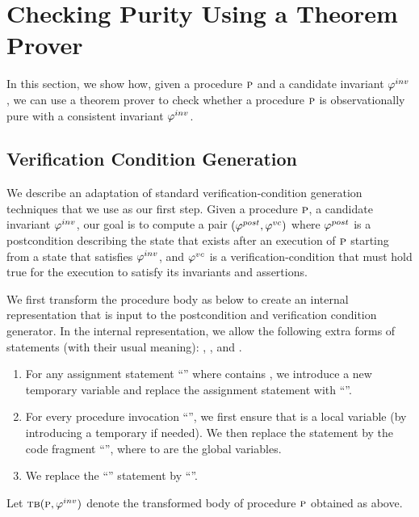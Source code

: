 \newcommand{\existformula}{\psi^e}
\newcommand{\EA}{\textsc{ea}}
\newcommand{\IW}{\textsc{iw}}

\newcommand{\initformula}{\logicalformula{init}}

\section{Checking Purity Using a Theorem Prover}

In this section, we show how, given a procedure $\textsc{p}$ and a candidate invariant $\varphi^{inv}$, we can use a theorem prover
to check whether a procedure $\textsc{p}$ is observationally pure with a consistent invariant $\varphi^{inv}$.



\subsection{Verification Condition Generation}

We describe an adaptation of standard verification-condition generation techniques that we use as our first step.
Given a procedure $\textsc{p}$, a candidate invariant $\varphi^{inv}$, our goal is to compute a
pair $(\varphi^{post},\varphi^{vc})$ where $\varphi^{post}$ is a postcondition describing the state that exists after an execution of
$\textsc{p}$ starting from a state that satisfies $\varphi^{inv}$, and $\varphi^{vc}$ is a verification-condition that must hold true
for the execution to satisfy its invariants and assertions.

We first transform the procedure body as below to create an internal representation that is input to the
postcondition and verification condition generator. In the internal representation, we allow the following
extra forms of statements (with their usual meaning): , , and  .
\begin{enumerate}
\item For any assignment statement ``'' where  contains , we introduce a new temporary
variable  and replace the assignment statement with ``''.
\item For every procedure invocation ``'', we first ensure that  is a local variable (by introducing
a temporary if needed). We then replace the statement by the code fragment
``'',
where  to  are the global variables.
\item We replace the ``'' statement by ``''.
\end{enumerate}
Let $\textsc{tb}(\textsc{p}, \varphi^{inv})$ denote the transformed body of procedure $\textsc{p}$ obtained as above.

